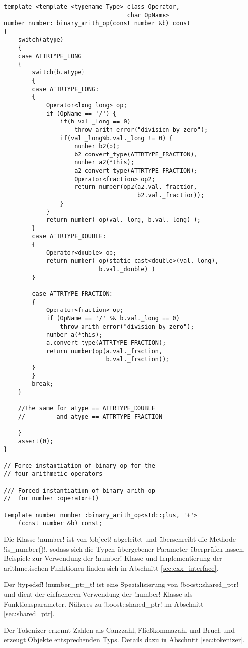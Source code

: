 \begin{lstlisting}[caption={Arithmetische Operatoren}, label=lst:op_template]
template <template <typename Type> class Operator,
                                   char OpName>
number number::binary_arith_op(const number &b) const
{
    switch(atype)
    {
    case ATTRTYPE_LONG:
    {
        switch(b.atype)
        {
        case ATTRTYPE_LONG:
        {
            Operator<long long> op;
            if (OpName == '/') {
                if(b.val._long == 0)
                    throw arith_error("division by zero");
                if(val._long%b.val._long != 0) {
                    number b2(b);
                    b2.convert_type(ATTRTYPE_FRACTION);
                    number a2(*this);
                    a2.convert_type(ATTRTYPE_FRACTION);
                    Operator<fraction> op2;
                    return number(op2(a2.val._fraction,
                                      b2.val._fraction));
                }
            }
            return number( op(val._long, b.val._long) );
        }
        case ATTRTYPE_DOUBLE:
        {
            Operator<double> op;
            return number( op(static_cast<double>(val._long),
                           b.val._double) )
        }

        case ATTRTYPE_FRACTION:
        {
            Operator<fraction> op;
            if (OpName == '/' && b.val._long == 0)
                throw arith_error("division by zero");
            number a(*this);
            a.convert_type(ATTRTYPE_FRACTION);
            return number(op(a.val._fraction,
                             b.val._fraction));
        }
        }
        break;
    }

    //the same for atype == ATTRTYPE_DOUBLE
    //         and atype == ATTRTYPE_FRACTION

    }
    assert(0);
}

// Force instantiation of binary_op for the
// four arithmetic operators

/// Forced instantiation of binary_arith_op
//  for number::operator+()

template number number::binary_arith_op<std::plus, '+'>
    (const number &b) const;
\end{lstlisting}
Die Klasse !number! ist von !object! abgeleitet und überschreibt die Methode !is_number()!, sodass sich die Typen übergebener Parameter überprüfen lassen. Beispiele zur Verwendung der !number! Klasse und Implementierung der arithmetischen Funktionen finden sich in Abschnitt \ref{sec:cxx_interface}.

Der !typedef! !number_ptr_t! ist eine Spezialisierung von !boost::shared_ptr! und dient der einfacheren Verwendung der !number! Klasse als Funktionsparameter. Näheres zu !boost::shared_ptr! im Abschnitt \ref{sec:shared_ptr}.

Der Tokenizer erkennt Zahlen als Ganzzahl, Fließkommazahl und Bruch und erzeugt Objekte entsprechenden Typs. Details dazu in Abschnitt \ref{sec:tokenizer}.